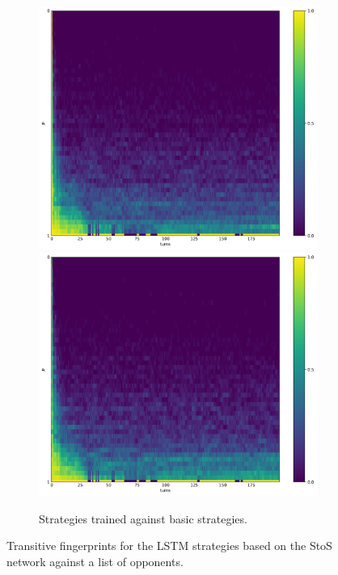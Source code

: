 \begin{figure}[!htbp]
\begin{subfigure}{\textwidth}
        \includegraphics[width=.3\textwidth]{src/chapters/07/img/default_basic_sequence_1.pdf}
        \includegraphics[width=.3\textwidth]{src/chapters/07/img/default_basic_sequence_0_78.pdf}
        \caption{Strategies trained against basic strategies.}
    \end{subfigure}
    \caption{Transitive fingerprints for the LSTM strategies based on the StoS
    network against a list of \Random opponents.}\label{fig:transitive_fingerprints_default_s_to_s}
\end{figure}


